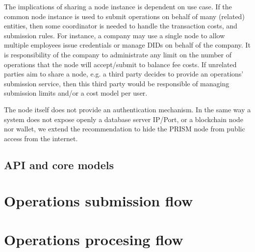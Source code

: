 \documentclass[10pt,a4paper]{article}
\begin{document}
The implications of sharing a node instance is dependent on use case. If the common node instance is used to submit operations on behalf of many (related) entities, then some coordinator is needed to handle the transaction costs, and submission rules. For instance, a company may use a single node to allow multiple employees issue credentials or manage DIDs on behalf of the company. It is responsibility of the company to administrate any limit on the number of operations that the node will accept/submit to balance fee costs. If unrelated parties aim to share a node, e.g. a third party decides to provide an operations' submission service, then this third party would be responsible of managing submission limits and/or a cost model per user.

The node itself does not provide an authentication mechanism. In the same way a system does not expose openly a database server IP/Port, or a blockchain node nor wallet, we extend the recommendation to hide the PRISM node from public access from the internet.


\subsection{API and core models}

\section{Operations submission flow}

\section{Operations procesing flow}
\end{document}
